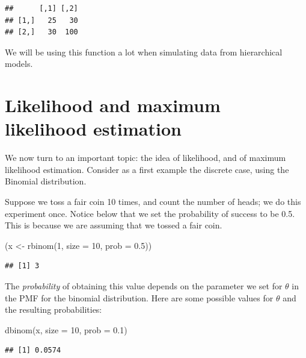 \documentclass[
  12pt,
]{krantz}
\newenvironment{Shaded}{\begin{snugshade}}{\end{snugshade}}
\newcommand{\AttributeTok}[1]{\textcolor[rgb]{0.77,0.63,0.00}{#1}}
\newcommand{\DecValTok}[1]{\textcolor[rgb]{0.00,0.00,0.81}{#1}}
\newcommand{\FloatTok}[1]{\textcolor[rgb]{0.00,0.00,0.81}{#1}}
\newcommand{\FunctionTok}[1]{\textcolor[rgb]{0.00,0.00,0.00}{#1}}
\newcommand{\NormalTok}[1]{#1}
\newcommand{\OtherTok}[1]{\textcolor[rgb]{0.56,0.35,0.01}{#1}}
\theoremstyle{definition}
\theoremstyle{definition}
\theoremstyle{definition}
\theoremstyle{definition}
\theoremstyle{remark}
\begin{document}
\begin{verbatim}
##      [,1] [,2]
## [1,]   25   30
## [2,]   30  100
\end{verbatim}

We will be using this function a lot when simulating data from hierarchical models.

\hypertarget{likelihood-and-maximum-likelihood-estimation}{%
\section{Likelihood and maximum likelihood estimation}\label{likelihood-and-maximum-likelihood-estimation}}

We now turn to an important topic: the idea of likelihood, and of maximum likelihood estimation. Consider as a first example the discrete case, using the Binomial distribution.

Suppose we toss a fair coin 10 times, and count the number of heads; we do this experiment once. Notice below that we set the probability of success to be 0.5. This is because we are assuming that we tossed a fair coin.

\begin{Shaded}
\begin{Highlighting}[]
\NormalTok{(x }\OtherTok{\textless{}{-}} \FunctionTok{rbinom}\NormalTok{(}\DecValTok{1}\NormalTok{, }\AttributeTok{size =} \DecValTok{10}\NormalTok{, }\AttributeTok{prob =} \FloatTok{0.5}\NormalTok{))}
\end{Highlighting}
\end{Shaded}

\begin{verbatim}
## [1] 3
\end{verbatim}

The \emph{probability} of obtaining this value depends on the parameter we set for \(\theta\) in the PMF for the binomial distribution. Here are some possible values for \(\theta\) and the resulting probabilities:

\begin{Shaded}
\begin{Highlighting}[]
\FunctionTok{dbinom}\NormalTok{(x, }\AttributeTok{size =} \DecValTok{10}\NormalTok{, }\AttributeTok{prob =} \FloatTok{0.1}\NormalTok{)}
\end{Highlighting}
\end{Shaded}

\begin{verbatim}
## [1] 0.0574
\end{verbatim}
\end{document}
